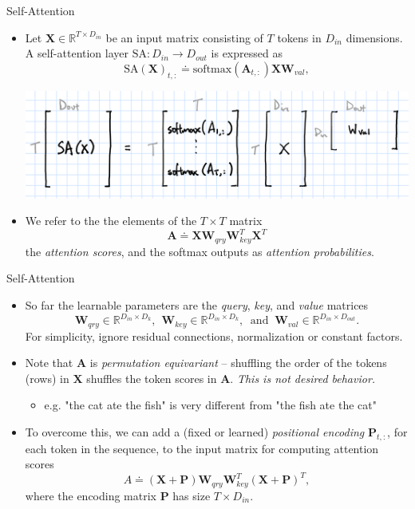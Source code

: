 \documentclass[9pt]{beamer}
\newcommand{\bb}{\mathbb}
\newcommand{\mb}{\bm}
\begin{document}
\begin{frame}{Self-Attention}
\begin{itemize}
\item Let $\bm X\in\bb R^{T\times D_{in}}$ be an input matrix consisting of $T$ tokens in $D_{in}$ dimensions. A self-attention layer $\mathrm{SA}:D_{in}\rightarrow D_{out}$ is expressed as
\begin{equation}
  \mathrm{SA}(\mb X)_{t,:} \doteq \mathrm{softmax}(\mb A_{t,:})\mb X\mb W_{val},
\end{equation}
\begin{center}
    \includegraphics[width=.7\textwidth]{images/softmax.png}
\end{center}
\vspace{.1in}

\item We refer to the the elements of the $T\times T$ matrix
\begin{equation}
\mb A \doteq \mb X \mb W_{qry}\mb W_{key}^T\mb X^T
\end{equation}
the {\em attention scores}, and the softmax outputs as {\em attention probabilities}.
\end{itemize}
\end{frame}


\begin{frame}{Self-Attention}
\begin{itemize}
\item So far the learnable parameters are the {\em query}, {\em key}, and {\em value} matrices
$$\mb W_{qry} \in \bb R^{D_{in}\times{D_k}}, \ \ 
\mb W_{key} \in \bb R^{D_{in}\times{D_k}},\ \text{ and } \ 
\mb W_{val} \in \bb R^{D_{in}\times{D_{out}}}.$$
For simplicity, ignore residual connections, normalization or constant factors.

\vspace{.15in}
\item Note that $\bm A$ is {\em permutation equivariant} -- shuffling the order of the tokens (rows) in $\bm X$ shuffles the token scores in $\bm A$. {\em This is not desired behavior.}
\begin{itemize}
    \item e.g. "the cat ate the fish" is very different from "the fish ate the cat"
\end{itemize}

\vspace{.1in}
\item To overcome this, we can add a (fixed or learned) {\em positional encoding} $\bm P_{t,:}$, for each token in the sequence, to the input matrix for computing attention scores
\begin{equation}
A \doteq (\mb X + \mb P)\mb W_{qry}\mb W_{key}^T (\mb X + \mb P)^T,
\end{equation}
where the encoding matrix $\bm P$ has size $T\times D_{in}$.
\end{itemize}
\end{frame}
\end{document}
